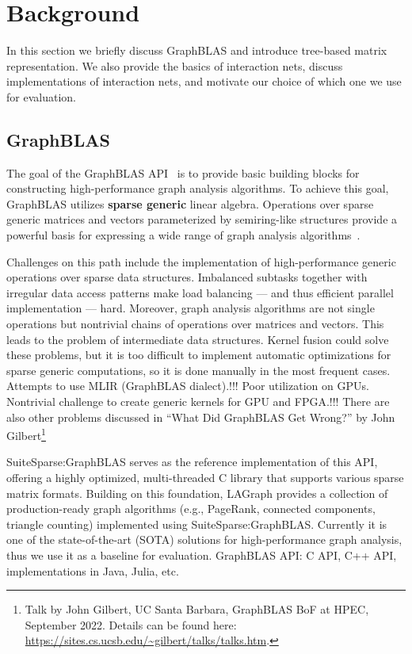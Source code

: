 \section{Background}\label{sec:background}

In this section we briefly discuss GraphBLAS and introduce tree-based matrix representation.
We also provide the basics of interaction nets, discuss implementations of interaction nets, and motivate our choice of which one we use for evaluation.

\subsection{GraphBLAS}

The goal of the GraphBLAS API~\cite{9460572} is to provide basic building blocks for constructing high-performance graph analysis algorithms.
To achieve this goal, GraphBLAS utilizes \textbf{sparse generic} linear algebra.
Operations over sparse generic matrices and vectors parameterized by semiring-like structures provide a powerful basis for expressing a wide range of graph analysis algorithms~\cite{8778338}.

Challenges on this path include the implementation of high-performance generic operations over sparse data structures.
Imbalanced subtasks together with irregular data access patterns make load balancing — and thus efficient parallel implementation — hard.
Moreover, graph analysis algorithms are not single operations but nontrivial chains of operations over matrices and vectors.
This leads to the problem of intermediate data structures.
Kernel fusion could solve these problems, but it is too difficult to implement automatic optimizations for sparse generic computations, so it is done manually in the most frequent cases.
Attempts to use MLIR (GraphBLAS dialect).!!!
Poor utilization on GPUs. Nontrivial challenge to create generic kernels for GPU and FPGA.!!!
There are also other problems discussed in ``What Did GraphBLAS Get Wrong?'' by John Gilbert\footnote{Talk by John Gilbert, UC Santa Barbara, GraphBLAS BoF at HPEC, September 2022. Details can be found here: \url{https://sites.cs.ucsb.edu/~gilbert/talks/talks.htm}.}

SuiteSparse:GraphBLAS serves as the reference implementation of this API, offering a highly optimized, multi-threaded C library that supports various sparse matrix formats.
Building on this foundation, LAGraph provides a collection of production-ready graph algorithms (e.g., PageRank, connected components, triangle counting) implemented using SuiteSparse:GraphBLAS.
Currently it is one of the state-of-the-art (SOTA) solutions for high-performance graph analysis, thus we use it as a baseline for evaluation.
GraphBLAS API: C API, C++ API, implementations in Java, Julia, etc.

